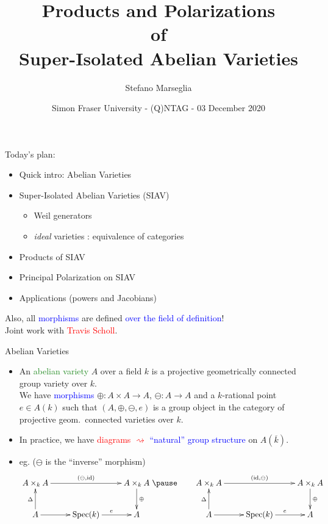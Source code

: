\documentclass[usenames,dvipsnames,handout]{beamer}
\title[]{Products and Polarizations\\ of\\ Super-Isolated Abelian Varieties}
\subtitle{}
\author[Stefano Marseglia]{Stefano Marseglia}
\institute[]{Utrecht University}
\date[03 December 2020]{Simon Fraser University - (Q)NTAG - 03 December 2020}
\newcommand{\red}[1]{\textcolor{red}{#1}}
\newcommand{\blue}[1]{\textcolor{blue}{#1}}
\newcommand{\green}[1]{\textcolor{ForestGreen}{#1}}
\begin{document}

\begin{frame}
\titlepage
\end{frame}

\begin{frame}{ Today's plan: }
	\begin{itemize}
	 \item Quick intro: Abelian Varieties 
	 \pause \item Super-Isolated Abelian Varieties (SIAV)
	 \pause
	 \begin{itemize}
    	 \item Weil generators
		 \item \textit{ideal} varieties : equivalence of categories	 
	 \end{itemize}
	 \pause \item Products of SIAV
	 \pause \item Principal Polarization on SIAV
	 \pause \item Applications (powers and Jacobians)
	\end{itemize}
	\pause Also, all \blue{morphisms} are defined \blue{over the field of definition}!\\
	
	\pause Joint work with \red{Travis Scholl}.
\end{frame}

\begin{frame}{ Abelian Varieties }
	\begin{itemize}
	 \item An \green{abelian variety} $A$ over a field $k$ is a projective geometrically connected group variety over $k$.\\
	 \pause We have \blue{morphisms} $\oplus:A\times A \to A$, $\ominus:A\to A$ and a $k$-rational point $e\in A(k)$ such that $(A,\oplus,\ominus,e)$ is a group object in the category of projective geom.~connected varieties over $k$.
	 \pause \item In practice, we have \red{diagrams $\rightsquigarrow$} \blue{``natural'' group structure} on $A(\overline k)$.
	 \pause \item eg. ($\ominus$ is the ``inverse'' morphism)
	 {\tiny
	 \[ 
	 	\xymatrix{
	 		A\times_k A \ar[rr]^{(\ominus,\mathrm{id})} 	& 						& A\times_k A \ar[d]^{\oplus}\\
	 		A \ar[u]^{\Delta} \ar[r] 	& \mathrm{Spec}(k) \ar[r]^{e}	& A 
	 	}
	 	\pause \qquad
	 	\xymatrix{
	 		A\times_k A \ar[rr]^{(\mathrm{id},\ominus)} 	& 						& A\times_k A \ar[d]^{\oplus}\\
	 		A \ar[u]^{\Delta} \ar[r] 	& \mathrm{Spec}(k) \ar[r]^{e}	& A 
	 	}
	  \]}
	\end{itemize}
\end{frame}
\end{document}
